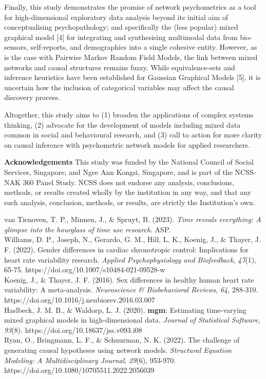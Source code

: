\documentclass[11pt]{article}
\begin{document}
Finally, this study demonstrates the promise of network psychometrics as a tool for high-dimensional exploratory data analysis beyond its initial aim of conceptualising psychopathology; and specifically the (less popular) mixed graphical model [4] for integrating and synthesising multimodal data from bio-sensors, self-reports, and demographics into a single cohesive entity. However, as is the case with Pairwise Markov Random Field Models, the link between mixed networks and causal structures remains fuzzy. While equivalence-sets and inference heuristics have been established for Gaussian Graphical Models [5], it is uncertain how the inclusion of categorical variables may affect the causal discovery process.

Altogether, this study aims to (1) broaden the applications of complex systems thinking, (2) advocate for the development of models including mixed data common in social and behavioural research, and (3) call to action for more clarity on causal inference with psychometric network models for applied researchers.

\textbf{Acknowledgements} This study was funded by the National Council of Social Services, Singapore, and Ngee Ann Kongsi, Singapore, and is part of the NCSS-NAK 360 Panel Study. NCSS does not endorse any analysis, conclusions, methods, or results created wholly by the institution in any way, and that any such analysis, conclusion, methods, or results, are strictly the Institution's own.

\pagebreak
{\small
\noindent[1] van Tienoven, T. P., Minnen, J., \& Spruyt, B. (2023). \textit{Time reveals everything: A glimpse into the hourglass of time use research}. ASP. \\
\noindent[2] Williams, D. P., Joseph, N., Gerardo, G. M., Hill, L. K., Koenig, J., \& Thayer, J. F. (2022). Gender differences in cardiac chronotropic control: Implications for heart rate variability research. \textit{Applied Psychophysiology and Biofeedback}, \textit{47}(1), 65-75. https://doi.org/10.1007/s10484-021-09528-w \\
\noindent[3] Koenig, J., \& Thayer, J. F. (2016). Sex differences in healthy human heart rate variability: A meta-analysis. \textit{Neuroscience \& Biobehavioral Reviews}, \textit{64}, 288-310. https://doi.org/10.1016/j.neubiorev.2016.03.007 \\
\noindent[4] Haslbeck, J. M. B., \& Waldorp, L. J. (2020). \textbf{mgm}: Estimating time-varying mixed graphical models in high-dimensional data. \textit{Journal of Statistical Software}, \textit{93}(8). https://doi.org/10.18637/jss.v093.i08 \\
\noindent[5] Ryan, O., Bringmann, L. F., \& Schuurman, N. K. (2022). The challenge of generating causal hypotheses using network models. \textit{Structural Equation Modeling: A Multidisciplinary Journal}, \textit{29}(6), 953-970. \\ https://doi.org/10.1080/10705511.2022.2056039 \\
}
\end{document}
